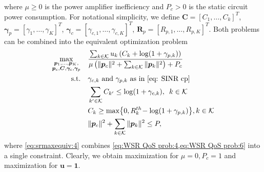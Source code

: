 \documentclass[a4paper,10pt,journal]{IEEEtran}
\let\vec\bm
\begin{document}
where $\mu \ge 0$ is the power amplifier inefficiency and $P_c > 0$ is the static circuit power consumption.
For notational simplicity, we define $\vec C = [C_1, \dots ,C_k]^T$, $\vec \gamma_{p} = [\gamma_{1}, \dots, \gamma_K]^T$, $\vec \gamma_{c} = [\gamma_{c,1}, \dots, \gamma_{c,K}]^T$, $\vec R_p = [R_{p,1}, \dots, R_{p,K}]^T$.
Both problems can be combined into the equivalent optimization problem
\begin{subequations} \label{eq:srmaxequiv}
	\begin{align}
		\max_{\substack{\vec p_1, \dots, \vec p_K,\\ \vec p_c, \vec C, \vec \gamma_c, \vec \gamma_p}}\quad
		&\frac{\sum_{k\in\mathcal{K}} u_k \left(C_k+\log(1+ \gamma_{p,k})\right)}{\mu \left( \Vert \vec p_c \Vert^2 + \sum_{k\in\mathcal K} \Vert \vec p_k \Vert^2 \right) + P_c}\\
	\mbox{s.t.}\quad
	& \gamma_{c,k} \text{ and } \gamma_{p,k} \text{ as in \eqref{eq: SINR cp}}\label{eq:srmaxequiv:2} \\
	& \sum_{k'\in \mathcal{K}}C_{k'}\leq \log(1+ \gamma_{c,k}), \enskip k\in\mathcal{K} \label{eq:srmaxequiv:3} \\
	& C_k \geq \max\!\left\{ 0, R_k^{th}\! - \log(1+ \gamma_{p,k}) \right\}\!,  k\in\mathcal{K} \label{eq:srmaxequiv:4} \\
	& \Vert \vec p_c \Vert^2 + \sum_{k\in\mathcal K} \Vert \vec p_k \Vert^2 \le P \label{eq:srmaxequiv:6},
	\end{align}
\end{subequations}
where \cref{eq:srmaxequiv:4} combines \cref{eq:WSR QoS prob:4,eq:WSR QoS prob:6} into a single constraint.
Clearly, we obtain  maximization for $\mu = 0, P_c = 1$ and  maximization for $\vec u = \vec 1$.
\end{document}
